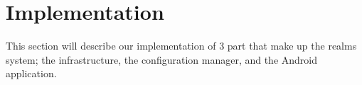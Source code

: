 \section{Implementation}
\label{sec.implementation}
This section will describe our implementation of 3 part that make up the realms system; the infrastructure, the configuration manager, and the Android application.